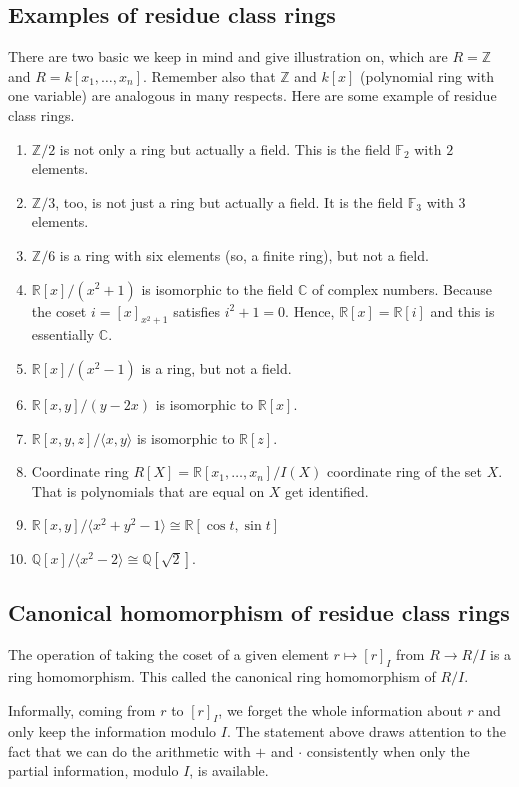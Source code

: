 \documentclass[11pt,a4paper]{amsart}
\newcommand{\Z}{{\mathbb{Z}}}
\newcommand{\R}{{\mathbb{R}}}
\newcommand{\Q}{{\mathbb{Q}}}
\newcommand{\F}{\mathbb{F}}
\newcommand{\C}{\mathbb{C}}
\begin{document}
\subsection{Examples of residue class rings} 
There are two basic we keep in mind and give illustration on, which are $R = \Z$ and $R= k [x_1,\ldots,x_n]$. Remember also that $\Z$ and $k[x]$ (polynomial ring with one variable) are analogous in many respects. Here are some example of residue class rings. 
\begin{enumerate} 
	\item $\Z / 2$ is not only a ring but actually a field. This is the field $\F_2$ with $2$ elements. 
	\item $ \Z / 3$, too, is not just a ring but actually a field. It is the field $\F_3$ with $3$ elements. 
	\item $\Z / 6$ is a ring with six elements (so, a finite ring), but not a field. 
	\item $\R[x] / (x^2+1)$ is isomorphic to the field $\C$ of complex numbers. Because the coset $i=[x]_{x^2+1}$ satisfies $i^2 + 1 = 0$. Hence, $\R[x] = \R[i]$ and this is essentially $\C$. 
	\item $\R[x] / (x^2 - 1) $ is a ring, but not a field. 
	\item  $\R[x,y] / (y-2  x)$ is isomorphic to $\R[x].$ 
	\item $\R[x,y,z] / \langle x, y \rangle $ is isomorphic to $\R[z]$. 
	\item Coordinate ring $R[X]  = \R[x_1,\ldots,x_n]/ I(X)$ coordinate ring of the set $X$. That is polynomials that are equal on $X$ get identified.
	\item $\R[x,y] / \langle x^2 + y^2 - 1 \rangle \cong \R[\cos t, \sin t]$
	\item $\Q[x] / \langle x^2 - 2\rangle \cong \Q[\sqrt{2}]$. 
\end{enumerate} 

\subsection{Canonical homomorphism of residue class rings} The operation of taking the coset of a given element $r \mapsto [r]_I$ from $R \to R / I$ is a ring homomorphism. This called the canonical ring homomorphism of $R / I$. 

Informally, coming from $r$ to $[r]_I$, we forget the whole information about $r$ and only keep the information modulo $I$. The statement above draws attention to the fact that we can do the arithmetic with $+$ and $\cdot$ consistently when only the partial information, modulo $I$, is available. 
\end{document}
